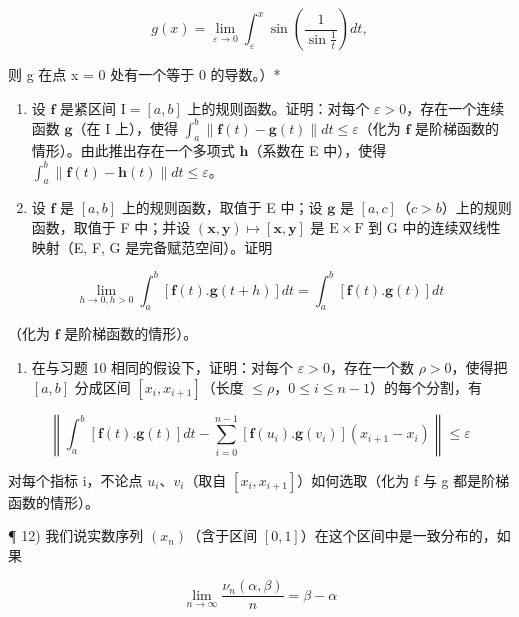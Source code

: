 \[
g (x) = \lim _ {\varepsilon \rightarrow 0} \int_ {\varepsilon} ^ {x} \sin \left(\frac {1}{\sin \frac {1}{t}}\right) d t,
\]

则 g 在点 x = 0 处有一个等于 0 的导数。）*

\begin{enumerate}
\def\labelenumi{\arabic{enumi})}
\setcounter{enumi}{8}
\item
  设 \(\mathbf{f}\) 是紧区间 \(\mathrm{I} = [a, b]\) 上的规则函数。证明：对每个 \(\varepsilon > 0\)，存在一个连续函数 \(\mathbf{g}\)（在 \(\mathrm{I}\) 上），使得 \(\int_{a}^{b} \| \mathbf{f}(t) - \mathbf{g}(t) \| dt \leqslant \varepsilon\)（化为 \(\mathbf{f}\) 是阶梯函数的情形）。由此推出存在一个多项式 \(\mathbf{h}\)（系数在 E 中），使得 \(\int_{a}^{b} \| \mathbf{f}(t) - \mathbf{h}(t) \| dt \leqslant \varepsilon\)。
\item
  设 \(\mathbf{f}\) 是 \([a, b]\) 上的规则函数，取值于 E 中；设 \(\mathbf{g}\) 是 \([a, c]\)（\(c > b\)）上的规则函数，取值于 F 中；并设 \((\mathbf{x}, \mathbf{y}) \mapsto [\mathbf{x}, \mathbf{y}]\) 是 \(\mathrm{E} \times \mathrm{F}\) 到 G 中的连续双线性映射（E, F, G 是完备赋范空间）。证明
\end{enumerate}

\[
\lim _ {h \rightarrow 0, h > 0} \int_ {a} ^ {b} [ \mathbf {f} (t). \mathbf {g} (t + h) ] d t = \int_ {a} ^ {b} [ \mathbf {f} (t). \mathbf {g} (t) ] d t
\]

（化为 \(\mathbf{f}\) 是阶梯函数的情形）。

\begin{enumerate}
\def\labelenumi{\arabic{enumi})}
\setcounter{enumi}{10}
\tightlist
\item
  在与习题 10 相同的假设下，证明：对每个 \(\varepsilon > 0\)，存在一个数 \(\rho > 0\)，使得把 \([a, b]\) 分成区间 \([x_i, x_{i+1}]\)（长度 \(\leqslant \rho\)，\(0 \leqslant i \leqslant n-1\)）的每个分割，有
\end{enumerate}

\[
\left\| \int_ {a} ^ {b} [ \mathbf {f} (t). \mathbf {g} (t) ] d t - \sum_ {i = 0} ^ {n - 1} [ \mathbf {f} (u _ {i}). \mathbf {g} (v _ {i}) ] (x _ {i + 1} - x _ {i}) \right\| \leqslant \varepsilon
\]

对每个指标 i，不论点 \(u_{i}\)、\(v_{i}\)（取自 \([x_{i}, x_{i+1}]\)）如何选取（化为 f 与 g 都是阶梯函数的情形）。

¶ 12) 我们说实数序列 \((x_{n})\)（含于区间 \([0, 1]\)）在这个区间中是一致分布的，如果

\[
\lim _ {n \to \infty} \frac {\nu_ {n} (\alpha , \beta)}{n} = \beta - \alpha\tag{1}
\]


